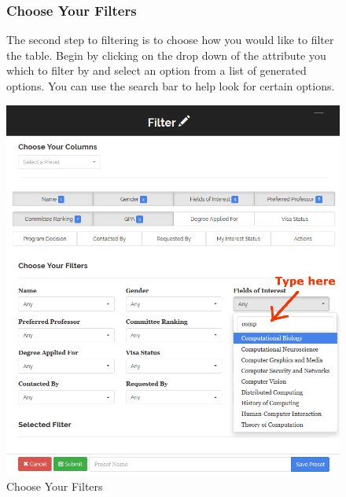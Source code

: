 \documentclass[fontsize=12pt,paper=letter,twoside]{scrartcl}
\begin{document}
\begin{figure}[!htb]
\subsubsection{Choose Your Filters}
The second step to filtering is to choose how you would like to filter the table. Begin by clicking on the drop down of the attribute you which to filter by and select an option from a list of generated options. You can use the search bar to help look for certain options.
\begin{center}
\includegraphics[width=.99\textwidth]{images/choose_filters.png}
\end{center}
\caption{Choose Your Filters}
\label{fig:choose_filters}
\end{figure}
\end{document}
